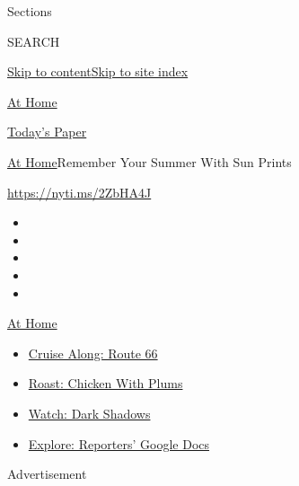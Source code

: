 Sections

SEARCH

\protect\hyperlink{site-content}{Skip to
content}\protect\hyperlink{site-index}{Skip to site index}

\href{https://www.nytimes3xbfgragh.onion/spotlight/at-home}{At Home}

\href{https://myaccount.nytimes3xbfgragh.onion/auth/login?response_type=cookie\&client_id=vi}{}

\href{https://www.nytimes3xbfgragh.onion/section/todayspaper}{Today's
Paper}

\href{/spotlight/at-home}{At Home}\textbar{}Remember Your Summer With
Sun Prints

\url{https://nyti.ms/2ZbHA4J}

\begin{itemize}
\item
\item
\item
\item
\item
\end{itemize}

\href{https://www.nytimes3xbfgragh.onion/spotlight/at-home?action=click\&pgtype=Article\&state=default\&region=TOP_BANNER\&context=at_home_menu}{At
Home}

\begin{itemize}
\tightlist
\item
  \href{https://www.nytimes3xbfgragh.onion/2020/09/07/travel/route-66.html?action=click\&pgtype=Article\&state=default\&region=TOP_BANNER\&context=at_home_menu}{Cruise
  Along: Route 66}
\item
  \href{https://www.nytimes3xbfgragh.onion/2020/09/04/dining/sheet-pan-chicken.html?action=click\&pgtype=Article\&state=default\&region=TOP_BANNER\&context=at_home_menu}{Roast:
  Chicken With Plums}
\item
  \href{https://www.nytimes3xbfgragh.onion/2020/09/04/arts/television/dark-shadows-stream.html?action=click\&pgtype=Article\&state=default\&region=TOP_BANNER\&context=at_home_menu}{Watch:
  Dark Shadows}
\item
  \href{https://www.nytimes3xbfgragh.onion/interactive/2020/at-home/even-more-reporters-editors-diaries-lists-recommendations.html?action=click\&pgtype=Article\&state=default\&region=TOP_BANNER\&context=at_home_menu}{Explore:
  Reporters' Google Docs}
\end{itemize}

Advertisement

